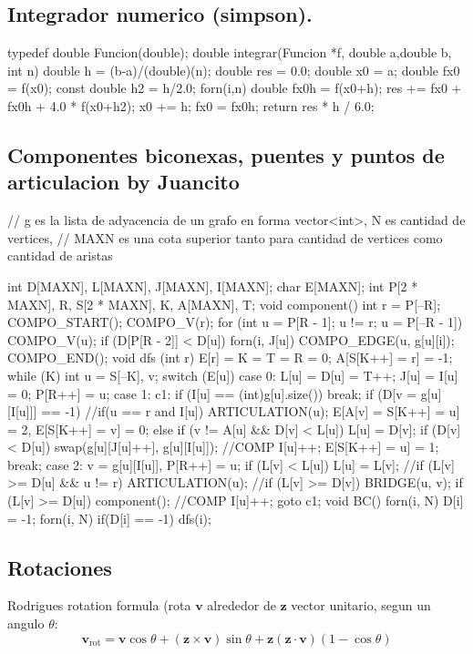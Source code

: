 \documentclass[10pt,landscape,twocolumn,a4paper,notitlepage]{article}
\begin{document}
\subsection{Integrador numerico (simpson).}
\begin{code}
typedef double Funcion(double);
double integrar(Funcion *f, double a,double b, int n) {
	double h = (b-a)/(double)(n);
	double res = 0.0;
	double x0 = a;
	double fx0 = f(x0);
	const double h2 = h/2.0;
	forn(i,n) {
		double fx0h = f(x0+h);
		res += fx0 + fx0h + 4.0 * f(x0+h2);
		x0 += h;
		fx0 = fx0h;
	}
	return res * h / 6.0;
}
\end{code}
\subsection{Componentes biconexas, puentes y puntos de articulacion by Juancito}
\begin{code}
// g es la lista de adyacencia de un grafo en forma vector<int>, N es cantidad de vertices,
// MAXN es una cota superior tanto para cantidad de vertices como cantidad de aristas

int D[MAXN], L[MAXN], J[MAXN], I[MAXN]; char E[MAXN];
int P[2 * MAXN], R, S[2 * MAXN], K, A[MAXN], T;
void component() {
    int r = P[--R]; COMPO_START(); COMPO_V(r);
    for (int u = P[R - 1]; u != r; u = P[--R - 1]) {
        COMPO_V(u);
        if (D[P[R - 2]] < D[u]) forn(i, J[u]) COMPO_EDGE(u, g[u][i]);
    } COMPO_END();
}
void dfs (int r) {
    E[r] = K = T = R = 0; A[S[K++] = r] = -1;
    while (K) { int u = S[--K], v;
        switch (E[u]) {
        case 0: L[u] = D[u] = T++; J[u] = I[u] = 0; P[R++] = u;
        case 1: c1: if (I[u] == (int)g[u].size()) break;
            if (D[v = g[u][I[u]]] == -1) {
                //if(u == r and I[u]) ARTICULATION(u);
                E[A[v] = S[K++] = u] = 2, E[S[K++] = v] = 0;
            } else { if (v != A[u] && D[v] < L[u]) L[u] = D[v];
                if (D[v] < D[u]) swap(g[u][J[u]++], g[u][I[u]]); //COMP
                I[u]++; E[S[K++] = u] = 1;
            } break;
        case 2: v = g[u][I[u]], P[R++] = u;
            if (L[v] < L[u]) L[u] = L[v];
            //if (L[v] >= D[u] && u != r) ARTICULATION(u);
            //if (L[v] >= D[v]) BRIDGE(u, v);
            if (L[v] >= D[u]) component(); //COMP
            I[u]++; goto c1;
        }
    }
}
void BC()
{
    forn(i, N) D[i] = -1;
    forn(i, N) if(D[i] == -1) dfs(i);
}
\end{code}
\subsection{Rotaciones}
Rodrigues rotation formula (rota $\mathbf{v}$ alrededor de $\mathbf{z}$ vector unitario, segun un angulo $\theta$:
$$\mathbf{v}_\mathrm{rot} = \mathbf{v} \cos\theta + (\mathbf{z} \times \mathbf{v})\sin\theta   + \mathbf{z} (\mathbf{z} \cdot \mathbf{v}) (1 - \cos\theta)$$
\end{document}
